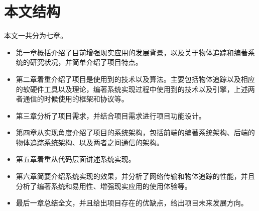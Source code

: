 \section{本文结构}
本文一共分为七章。
\begin{itemize}[noitemsep,topsep=0pt,parsep=0pt,partopsep=0pt]
\item 第一章概括介绍了目前增强现实应用的发展背景，以及关于物体追踪和编著系统的研究状况，并简单介绍了项目特点。
\item 第二章着重介绍了项目是使用到的技术以及算法。主要包括物体追踪以及相应的软硬件工具以及理论，编著系统实现过程中使用到的技术以及引擎，上述两者通信的时候使用的框架和协议等。
\item 第三章分析了项目需求，并结合项目需求进行项目功能设计。
\item 第四章从实现角度介绍了项目的系统架构，包括前端的编著系统架构、后端的物体追踪系统架构、以及两者之间通信的架构。
\item 第五章着重从代码层面讲述系统实现。
\item 第六章简要介绍系统实现的效果，并分析了网络传输和物体追踪的性能，并且分析了编著系统和易用性、增强现实应用的使用体验等。
\item 最后一章总结全文，并且给出项目存在的优缺点，给出项目未来发展方向。
\end{itemize}
